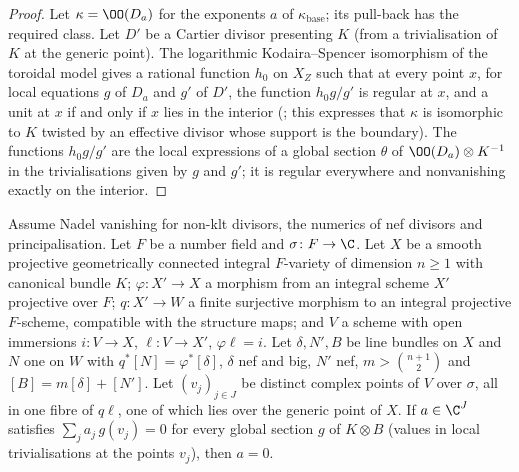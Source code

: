 \begin{proof}
Let $\kappa=\OO(D_a)$ for the exponents $a$ of $\kappa_{\mathrm{base}}$; its pull-back has the required
class. Let $D'$ be a Cartier divisor presenting $K$ (from a trivialisation of $K$ at the generic point). The
logarithmic Kodaira--Spencer isomorphism of the toroidal model gives a rational function $h_0$ on $X_Z$
such that at every point $x$, for local equations $g$ of $D_a$ and $g'$ of $D'$, the function $h_0g/g'$ is
regular at $x$, and a unit at $x$ if and only if $x$ lies in the interior
(; this expresses that
$\kappa$ is isomorphic to $K$ twisted by an effective divisor whose support is the boundary). The functions $h_0g/g'$ are the local expressions of a
global section $\theta$ of $\OO(D_a)\otimes K^{-1}$ in the trivialisations given by $g$ and $g'$; it is regular
everywhere and nonvanishing exactly on the interior.
\end{proof}

\begin{theorem}\label{pf:lift1:quotsep}
Assume Nadel vanishing for non-klt divisors, the numerics of nef divisors and principalisation. Let $F$
be a number field and $\sigma\colon F\to\C$. Let $X$ be a smooth projective geometrically connected
integral $F$-variety of dimension $n\ge1$ with canonical bundle $K$; $\varphi\colon X'\to X$ a morphism from an
integral scheme $X'$ projective over $F$; $q\colon X'\to W$ a finite surjective morphism to an integral
projective $F$-scheme, compatible with the structure maps; and $V$ a scheme with open immersions
$i\colon V\to X$, $\ell\colon V\to X'$, $\varphi\ell=i$. Let $\delta,N',B$ be line bundles on $X$ and $N$ one on
$W$ with $q^*[N]=\varphi^*[\delta]$, $\delta$ nef and big, $N'$ nef, $m>\binom{n+1}2$ and
$[B]=m[\delta]+[N']$. Let $(v_j)_{j\in J}$ be distinct complex points of $V$ over $\sigma$, all in one fibre of
$q\ell$, one of which lies over the generic point of $X$. If $a\in\C^J$ satisfies
$\sum_ja_j\,g(v_j)=0$ for every global section $g$ of $K\otimes B$ (values in local trivialisations at the
points $v_j$), then $a=0$.
\end{theorem}

